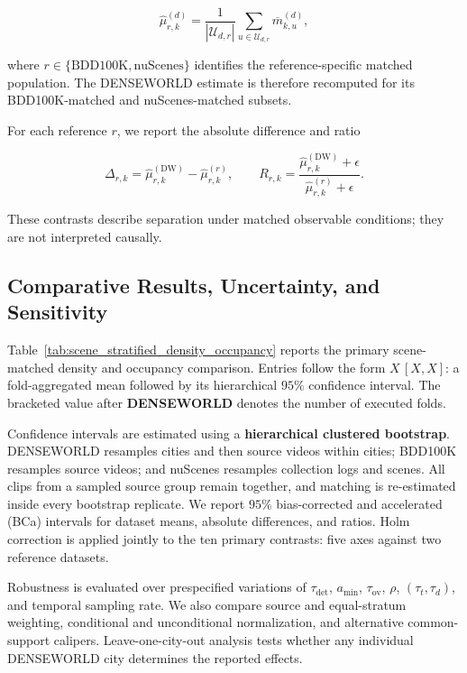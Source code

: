 \[
\widehat\mu_{r,k}^{(d)}
=
\frac{1}{|\mathcal U_{d,r}|}
\sum_{u\in\mathcal U_{d,r}}
\overline m_{k,u}^{(d)},
\]

where \(r\in\{\mathrm{BDD100K},\mathrm{nuScenes}\}\) identifies the
reference-specific matched population. The DENSEWORLD estimate is
therefore recomputed for its BDD100K-matched and nuScenes-matched
subsets.

For each reference \(r\), we report the absolute difference and ratio

\[
\Delta_{r,k}
=
\widehat\mu_{r,k}^{(\mathrm{DW})}
-
\widehat\mu_{r,k}^{(r)},
\qquad
R_{r,k}
=
\frac{
\widehat\mu_{r,k}^{(\mathrm{DW})}+\epsilon
}{
\widehat\mu_{r,k}^{(r)}+\epsilon
}.
\]

These contrasts describe separation under matched observable
conditions; they are not interpreted causally.


\subsection{Comparative Results, Uncertainty, and Sensitivity}
\label{app:five_axis_results}

Table~\ref{tab:scene_stratified_density_occupancy} reports the primary
scene-matched density and occupancy comparison. Entries follow the form \(X\,[X,X]\): a fold-aggregated
mean followed by its hierarchical \(95\%\) confidence interval. The
bracketed value after \textbf{DENSEWORLD} denotes the number of
executed folds.



Confidence intervals are estimated using a
\textbf{hierarchical clustered bootstrap}. DENSEWORLD resamples cities
and then source videos within cities; BDD100K resamples source videos;
and nuScenes resamples collection logs and scenes. All clips from a
sampled source group remain together, and matching is re-estimated
inside every bootstrap replicate. We report \(95\%\)
bias-corrected and accelerated (BCa) intervals for dataset means,
absolute differences, and ratios. Holm correction is applied jointly
to the ten primary contrasts: five axes against two reference datasets.

Robustness is evaluated over prespecified variations of
\(\tau_{\mathrm{det}}\), \(a_{\min}\), \(\tau_{\mathrm{ov}}\),
\(\rho\), \((\tau_t,\tau_d)\), and temporal sampling rate. We also
compare source and equal-stratum weighting, conditional and
unconditional normalization, and alternative common-support calipers.
Leave-one-city-out analysis tests whether any individual DENSEWORLD
city determines the reported effects.

